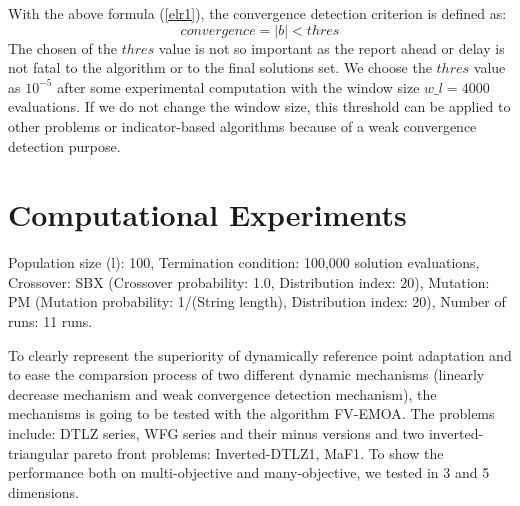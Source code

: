 \documentclass[conference]{IEEEtran}
\begin{document}
With the above formula (\ref{elr1}), the convergence detection criterion is defined as:
\begin{equation}\label{elr2}
  convergence = \lvert b \rvert < thres
\end{equation}
The chosen of the $thres$ value is not so important 
as the report ahead or delay is not fatal to the algorithm or to the final solutions set.
We choose the $thres$ value as $10^{-5}$ after some experimental computation with 
the window size $w\_ l = 4000$ evaluations. 
If we do not change the window size, 
this threshold can be applied to other problems or indicator-based algorithms
because of a weak convergence detection purpose.

% 
% 
%
\section{Computational Experiments}

Population size (l): 100,
Termination condition: 100,000 solution evaluations,
Crossover: SBX (Crossover probability: 1.0, Distribution index: 20),
Mutation: PM (Mutation probability: 1/(String length), Distribution index: 20),
Number of runs: 11 runs.

To clearly represent the superiority of dynamically reference point adaptation 
and to ease the comparsion process of two different dynamic mechanisms
(linearly decrease mechanism and weak convergence detection mechanism), 
the mechanisms is going to be tested with the algorithm FV-EMOA\cite{FVEMOA}. %
The problems include: 
DTLZ series\cite{DTLZ1}, WFG series\cite{WFG} and their minus versions\cite{minus}
and two inverted-triangular pareto front problems: 
Inverted-DTLZ1\cite{IDTLZ1}, MaF1\cite{MaF1}.
To show the performance both on multi-objective and many-objective, we tested in 3 and 5 dimensions.

% 
\end{document}
